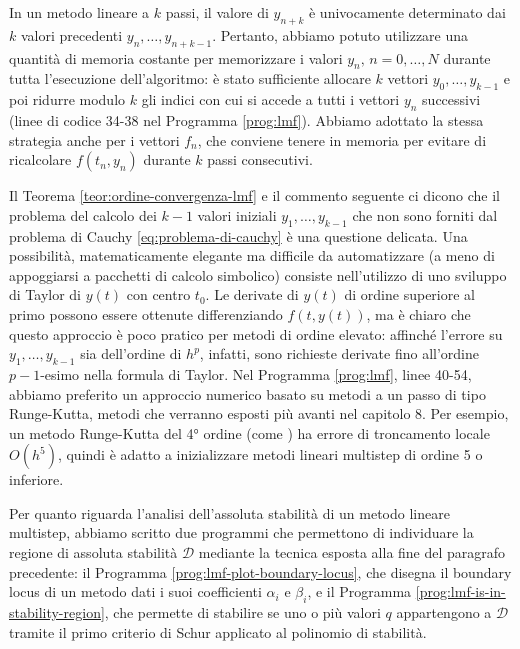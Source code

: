 In un metodo lineare a $k$ passi, il valore di $y_{n+k}$
è univocamente determinato dai $k$ valori precedenti $y_n,\dots,y_{n+k-1}$.
Pertanto, abbiamo potuto utilizzare una quantità di memoria costante
per memorizzare i valori $y_n, \, n = 0,\dots,N$ durante tutta l'esecuzione
dell'algoritmo: è stato sufficiente allocare $k$ vettori $y_0,\dots,y_{k-1}$
e poi ridurre modulo $k$ gli indici con cui si accede a tutti i vettori
$y_n$ successivi (linee di codice 34-38 nel Programma \ref{prog:lmf}).
Abbiamo adottato la stessa strategia anche per i vettori $f_n$,
che conviene tenere in memoria per evitare di ricalcolare $f(t_n,y_n)$
durante $k$ passi consecutivi.

Il Teorema \ref{teor:ordine-convergenza-lmf} e il commento seguente
ci dicono che il problema del calcolo dei $k-1$ valori iniziali
$y_1,\dots,y_{k-1}$ che non sono forniti dal problema di Cauchy
\eqref{eq:problema-di-cauchy} è una questione delicata.
Una possibilità, matematicamente elegante ma difficile da automatizzare
(a meno di appoggiarsi a pacchetti di calcolo simbolico) consiste nell'utilizzo
di uno sviluppo di Taylor di $y(t)$ con centro $t_0$.
Le derivate di $y(t)$ di ordine superiore al primo possono essere ottenute
differenziando $f(t,y(t))$, ma è chiaro che questo approccio è poco pratico
per metodi di ordine elevato: affinché l'errore su $y_1,\dots,y_{k-1}$
sia dell'ordine di $h^p$, infatti, sono richieste derivate fino all'ordine
$p-1$-esimo nella formula di Taylor.
Nel Programma \ref{prog:lmf}, linee 40-54, abbiamo preferito un approccio
numerico basato su metodi a un passo di tipo Runge-Kutta, metodi che
verranno esposti più avanti nel capitolo 8. Per esempio, un metodo Runge-Kutta
del 4° ordine (come ) ha errore di troncamento locale $O(h^5)$,
quindi è adatto a inizializzare metodi lineari multistep di ordine 5 o inferiore.

Per quanto riguarda l'analisi dell'assoluta stabilità di un metodo lineare
multistep, abbiamo scritto due programmi che permettono di individuare
la regione di assoluta stabilità $\mathcal{D}$ mediante la tecnica esposta
alla fine del paragrafo precedente: il Programma \ref{prog:lmf-plot-boundary-locus},
che disegna il boundary locus di un metodo dati i suoi coefficienti
$\alpha_i$ e $\beta_i$, e il Programma \ref{prog:lmf-is-in-stability-region},
che permette di stabilire se uno o più valori $q$ appartengono a $\mathcal{D}$
tramite il primo criterio di Schur applicato al polinomio di stabilità.

\clearpage

